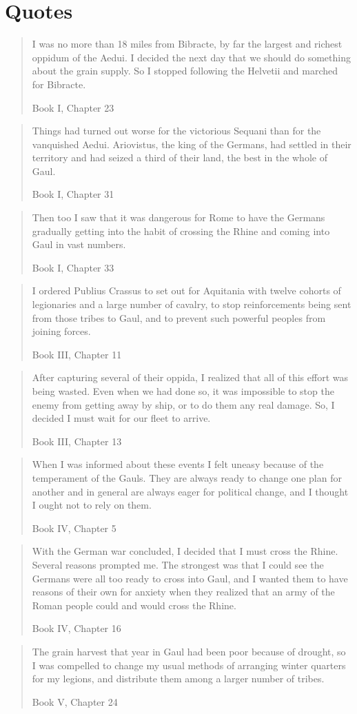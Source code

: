 \section{Quotes}
\par

\blockquote[Book I, Chapter 23]{I was no more than 18 miles from Bibracte, by far the largest and richest oppidum of the Aedui. I decided the next day that we should do something about the grain supply. So I stopped following the Helvetii and marched for Bibracte.}

\blockquote[Book I, Chapter 31]{Things had turned out worse for the victorious Sequani than for the vanquished Aedui. Ariovistus, the king of the Germans, had settled in their territory and had seized a third of their land, the best in the whole of Gaul.}

\blockquote[Book I, Chapter 33]{Then too I saw that it was dangerous for Rome to have the Germans gradually getting into the habit of crossing the Rhine and coming into Gaul in vast numbers.}

\blockquote[Book III, Chapter 11]{I ordered Publius Crassus to set out for Aquitania with twelve cohorts of legionaries and a large number of cavalry, to stop reinforcements being sent from those tribes to Gaul, and to prevent such powerful peoples from joining forces.}

\blockquote[Book III, Chapter 13]{After capturing several of their oppida, I realized that all of this effort was being wasted. Even when we had done so, it was impossible to stop the enemy from getting away by ship, or to do them any real damage. So, I decided I must wait for our fleet to arrive.}

\blockquote[Book IV, Chapter 5]{When I was informed about these events I felt uneasy because of the temperament of the Gauls. They are always ready to change one plan for another and in general are always eager for political change, and I thought I ought not to rely on them.}

\blockquote[Book IV, Chapter 16]{With the German war concluded, I decided that I must cross the Rhine. Several reasons prompted me. The strongest was that I could see the Germans were all too ready to cross into Gaul, and I wanted them to have reasons of their own for anxiety when they realized that an army of the Roman people could and would cross the Rhine.}

\blockquote[Book V, Chapter 24]{The grain harvest that year in Gaul had been poor because of drought, so I was compelled to change my usual methods of arranging winter quarters for my legions, and distribute them among a larger number of tribes.}

